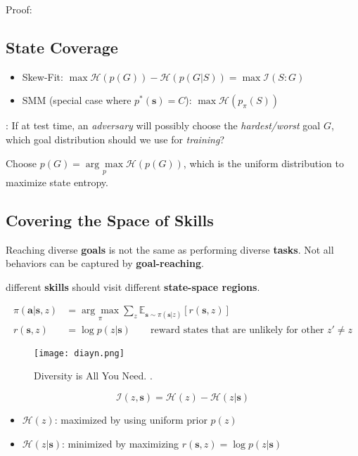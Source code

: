 Proof: \cite{lee2019efficient, hazan2019provably}

\subsection{State Coverage}
\begin{itemize}
	\item Skew-Fit: $\max \mathcal{H}(p(G)) - \mathcal{H}(p(G|S)) = \max \mathcal{I}(S:G)$ \cite{pong2019skew}
	\item SMM (special case where $p^*(\textbf{s})=C$): $\max \mathcal{H}(p_\pi(S))$ \cite{lee2019efficient}
\end{itemize}

: If at test time, an \textit{adversary} will possibly choose the \textit{hardest/worst} goal $G$, which goal distribution should we use for \textit{training}?

 Choose $p(G) = \underset{p}{\arg\max} \mathcal{H}(p(G))$, which is the uniform distribution to maximize state entropy. \cite{hazan2019provably, gupta2018unsupervised}

\subsection{Covering the Space of Skills}
Reaching diverse \textbf{goals} is not the same as performing diverse \textbf{tasks}. Not all behaviors can be captured by \textbf{goal-reaching}. \cite{gregor2016variational, eysenbach2018diversity}

 different \textbf{skills} should visit different \textbf{state-space regions}.

\begin{align}
	\pi(\textbf{a|s}, z) &= \underset{\pi}{\arg\max} \sum_z \mathbb{E}_{\textbf{s} \sim \pi(\textbf{s}|z)} [r(\textbf{s}, z)]\\
	r(\textbf{s}, z) &= \log p(z|\textbf{s}) \qquad \text{reward states that are unlikely for other $z' \neq z$}
\end{align}

\begin{figure}[hbt!]
	\centering
	\texttt{[image: diayn.png]}
	\caption{Diversity is All You Need. \cite{eysenbach2018diversity}.}
\end{figure}

\begin{equation}
	\mathcal{I}(z,\textbf{s}) = \mathcal{H}(z) - \mathcal{H}(z|\textbf{s})
\end{equation}
\begin{itemize}
	\item $\mathcal{H}(z)$: maximized by using uniform prior $p(z)$
	\item $\mathcal{H}(z|\textbf{s})$: minimized by maximizing $r(\textbf{s}, z) = \log p(z|\textbf{s})$
\end{itemize}

